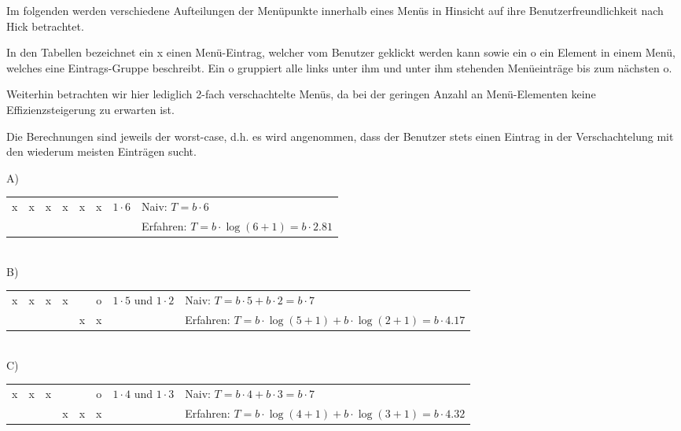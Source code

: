 \documentclass[a4paper,10pt]{article}
\begin{document}
\kopf
\renewcommand{\figurename}{Figure}

Im folgenden werden verschiedene Aufteilungen der Menüpunkte innerhalb eines Menüs in Hinsicht auf ihre Benutzerfreundlichkeit nach Hick betrachtet.

In den Tabellen bezeichnet ein x einen Menü-Eintrag, welcher vom Benutzer geklickt werden kann sowie ein o ein Element in einem Menü, welches eine Eintrags-Gruppe beschreibt. Ein o gruppiert alle links unter ihm und unter ihm stehenden Menüeinträge bis zum nächsten o.

Weiterhin betrachten wir hier lediglich 2-fach verschachtelte Menüs, da bei der geringen Anzahl an Menü-Elementen keine Effizienzsteigerung zu erwarten ist.

Die Berechnungen sind jeweils der worst-case, d.h. es wird angenommen, dass der Benutzer stets einen Eintrag in der Verschachtelung mit den wiederum meisten Einträgen sucht.

A)\\
\begin{tabular}{|c|c|c|c|c|c|l|l}
\cline{1-6} x & x & x & x & x & x & $1\cdot 6$ \: \: \: \: \: \: \: & Naiv: $T = b\cdot 6$ \\
\cline{1-6}   &   &   &   &   &   &   & Erfahren: $T = b\cdot \log(6+1) = b\cdot 2.81$\\
\cline{1-6}
\end{tabular} \\

B)\\
\begin{tabular}{|c|c|c|c|c|c|l|l}
\cline{1-6} x & x & x & x &   & o & $1\cdot 5$ und $1\cdot 2$ & Naiv: $T = b\cdot 5+b\cdot 2 = b\cdot 7$ \\
\cline{1-6}   &   &   &   & x & x &   & Erfahren: $T = b\cdot \log(5+1)+b\cdot \log(2+1) = b\cdot 4.17$ \\
\cline{1-6}
\end{tabular} \\

C)\\
\begin{tabular}{|c|c|c|c|c|c|l|l}
\cline{1-6} x & x & x &   &   & o & $1\cdot 4$ und $1\cdot 3$ & Naiv: $T = b\cdot 4+b\cdot 3 = b\cdot 7$ \\
\cline{1-6}   &   &   & x & x & x &   & Erfahren: $T = b\cdot \log(4+1)+b\cdot \log(3+1) = b\cdot 4.32$ \\
\cline{1-6}
\end{tabular} \\
\end{document}
